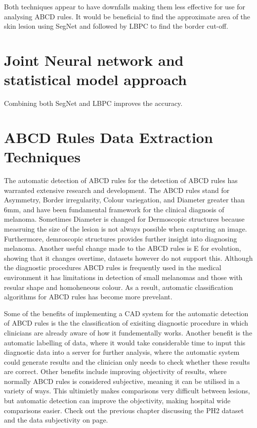 Both techniques appear to have downfalls making them less effective for use for analysing ABCD rules. It would be beneficial to find the approximate area of the skin lesion using SegNet and followed by LBPC to find the border cut-off.

\section{Joint Neural network and statistical model approach}


Combining both SegNet and LBPC improves the accuracy. 


















\section{ABCD Rules Data Extraction Techniques}
The automatic detection of ABCD rules for the detection of ABCD rules has warranted extensive research and development\cite{Ali2020}. The ABCD rules stand for Asymmetry, Border irregularity, Colour variegation, and Diameter greater than 6mm, and have been fundamental framework for the clinical diagnosis of melanoma. Sometimes Diameter is changed for Dermoscopic structures because measruing the size of the lesion is not always possible when capturing an image. Furthermore, demroscopic structures provides further insight into diagnosing melanoma\cite{}. Another useful change made to the ABCD rules is E for evolution, showing that it changes overtime, datasets however do not support this. Although the diagnostic procedures ABCD rules is frequently used in the medical environment it has limitations in detection of small melanomas and those with resular shape and homoheneous colour\cite{Dermoscopy Improves Accuracy of Primary Care Physicians to Triage Lesions Suggestive of Skin Cancer}. As a result, automatic classification algorithms for ABCD rules has become more prevelant\cite{Kasmi2016}.

Some of the benefits of implementing a CAD system for the automatic detection of ABCD rules is the the classification of exisiting diagnostic procedure in which clinicians are already aware of how it fundementally works. Another benefit is the automatic labelling of data, where it would take considerable time to input this diagnostic data into a server for further analysis, where the automatic system could generate results and the clinician only needs to check whether these results are correct. Other benefits include improving objectivity of results, where normally ABCD rules is considered subjective, meaning it can be utilised in a variety of ways. This ultimietly makes comparisons very difficult between lesions, but automatic detection can improve the objectivity, making hospital wide comparisons easier. Check out the previous chapter discussing the PH2 dataset and the data subjectivity on page\pageref*{ph2-image-assessment}.

